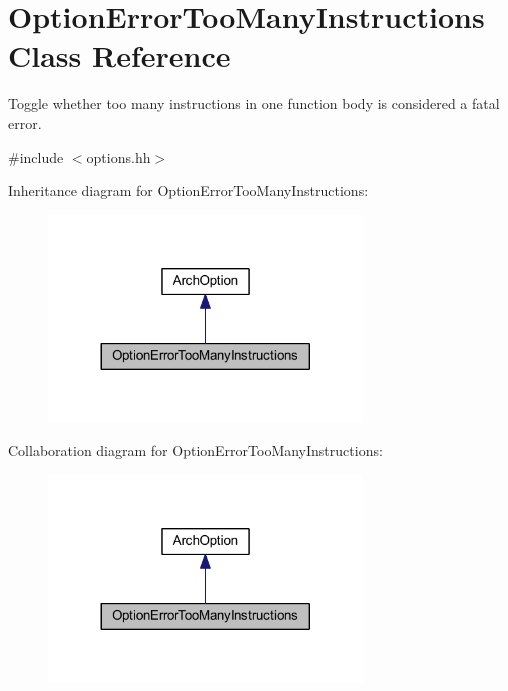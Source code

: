 \hypertarget{class_option_error_too_many_instructions}{}\section{Option\+Error\+Too\+Many\+Instructions Class Reference}
\label{class_option_error_too_many_instructions}


Toggle whether too many instructions in one function body is considered a fatal error.  




{\ttfamily \#include $<$options.\+hh$>$}



Inheritance diagram for Option\+Error\+Too\+Many\+Instructions\+:
\nopagebreak
\begin{figure}[H]
\begin{center}
\leavevmode
\includegraphics[width=236pt]{class_option_error_too_many_instructions__inherit__graph}
\end{center}
\end{figure}


Collaboration diagram for Option\+Error\+Too\+Many\+Instructions\+:
\nopagebreak
\begin{figure}[H]
\begin{center}
\leavevmode
\includegraphics[width=236pt]{class_option_error_too_many_instructions__coll__graph}
\end{center}
\end{figure}
